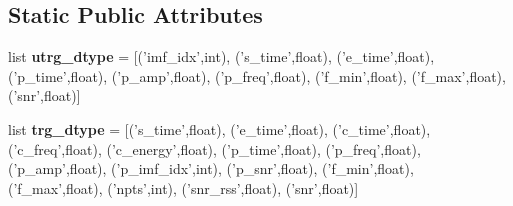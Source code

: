 \subsection*{Static Public Attributes}
\begin{DoxyCompactItemize}
\item 
\hypertarget{classpython_1_1__wrap_1_1etagen_abd7912f308ef9623da9dfcea0e8a1c95}{list {\bfseries utrg\-\_\-dtype} = \mbox{[}('imf\-\_\-idx',int), ('s\-\_\-time',float), ('e\-\_\-time',float), ('p\-\_\-time',float), ('p\-\_\-amp',float), ('p\-\_\-freq',float), ('f\-\_\-min',float), ('f\-\_\-max',float), ('snr',float)\mbox{]}}\label{classpython_1_1__wrap_1_1etagen_abd7912f308ef9623da9dfcea0e8a1c95}

\item 
\hypertarget{classpython_1_1__wrap_1_1etagen_a9e04218bd2d74e12cc0a91f5f8fd0bc1}{list {\bfseries trg\-\_\-dtype} = \mbox{[}('s\-\_\-time',float), ('e\-\_\-time',float), ('c\-\_\-time',float), ('c\-\_\-freq',float), ('c\-\_\-energy',float), ('p\-\_\-time',float), ('p\-\_\-freq',float), ('p\-\_\-amp',float), ('p\-\_\-imf\-\_\-idx',int), ('p\-\_\-snr',float), ('f\-\_\-min',float), ('f\-\_\-max',float), ('npts',int), ('snr\-\_\-rss',float), ('snr',float)\mbox{]}}\label{classpython_1_1__wrap_1_1etagen_a9e04218bd2d74e12cc0a91f5f8fd0bc1}

\end{DoxyCompactItemize}


